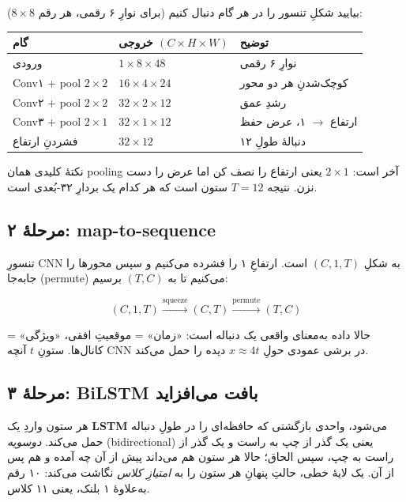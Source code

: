 \documentclass[12pt,a4paper]{article}
\begin{document}
بیایید شکلِ تنسور را در هر گام دنبال کنیم (برای نوارِ ۶ رقمی، هر رقم $8\times8$):

\begin{center}
\begin{tabular}{@{}lll@{}}
\hline
\textbf{گام} & \textbf{خروجی} $(C\times H\times W)$ & \textbf{توضیح} \\
\hline
ورودی & $1\times 8\times 48$ & نوارِ ۶ رقمی \\
Conv۱ + pool $2{\times}2$ & $16\times 4\times 24$ & کوچک‌شدنِ هر دو محور \\
Conv۲ + pool $2{\times}2$ & $32\times 2\times 12$ & رشدِ عمق \\
Conv۳ + pool $2{\times}1$ & $32\times 1\times 12$ & ارتفاع $\to$ ۱، عرض حفظ \\
فشردنِ ارتفاع & $32\times 12$ & دنبالهٔ طولِ ۱۲ \\
\hline
\end{tabular}
\end{center}

نکتهٔ کلیدی همان pooling آخر است: $2\times1$ یعنی ارتفاع را نصف کن اما عرض را دست نزن. نتیجه $T=12$ ستون است که هر کدام یک بردارِ ۳۲-بُعدی است.

\subsection{مرحلهٔ ۲: map-to-sequence}

تنسورِ CNN به شکلِ $(C,1,T)$ است. ارتفاعِ ۱ را فشرده می‌کنیم و سپس محورها را جابه‌جا (permute) می‌کنیم تا به $(T,C)$ برسیم:

\begin{riyazi}
\[
(C,1,T) \xrightarrow{\text{squeeze}} (C,T) \xrightarrow{\text{permute}} (T,C)
\]
\end{riyazi}

حالا داده به‌معنای واقعی یک دنباله است: «زمان» = موقعیتِ افقی، «ویژگی» = کانال‌ها. ستونِ $t$ آنچه CNN در برشی عمودی حولِ $x \approx 4t$ دیده را حمل می‌کند.

\subsection{مرحلهٔ ۳: BiLSTM بافت می‌افزاید}

هر ستون واردِ یک \textbf{LSTM} می‌شود، واحدی بازگشتی که حافظه‌ای را در طولِ دنباله حمل می‌کند. \emph{دوسویه} (bidirectional) یعنی یک گذر از چپ به راست و یک گذر از راست به چپ، سپس الحاق؛ حالا هر ستون هم می‌داند پیش از آن چه آمده و هم پس از آن. یک لایهٔ خطی، حالتِ پنهانِ هر ستون را به \emph{امتیازِ کلاس} نگاشت می‌کند: ۱۰ رقم به‌علاوهٔ ۱ بلنک، یعنی ۱۱ کلاس.
\end{document}
